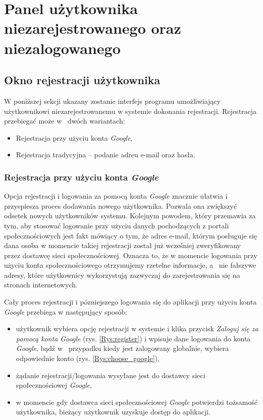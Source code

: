 \chapter{Panel użytkownika niezarejestrowanego oraz niezalogowanego}

\section{Okno rejestracji użytkownika}
W poniższej sekcji ukazany zostanie interfejs programu umożliwiający użytkownikowi niezarejestrowanemu w systemie dokonania rejestracji. Rejestracja przebiegać może w~ dwóch wariantach:
\begin{itemize}
	\item Rejestracja przy użyciu konta \textit{Google},
	\item Rejestracja tradycyjna -- podanie adreu e-mail oraz hasła.
\end{itemize}

\subsection{Rejestracja przy użyciu konta \textit{Google}}
Opcja rejestracji i logowania za pomocą konta \textit{Google} znacznie ułatwia i przyspiesza proces dodawania nowego użytkownika. Pozwala ona zwiększyć odsetek nowych użytkowników systemu. Kolejnym powodem, który przemawia za tym, aby stosować logowanie przy użyciu danych pochodzących z portali społecznościowych jest fakt mówiący o tym, że adres e-mail, którym posługuje się dana osoba w momencie takiej rejestracji został już wcześniej zweryfikowany przez dostawcę sieci społecznościowej. Oznacza to, że w momencie logowania przy użyciu konta społecznościowego otrzymujemy rzetelne informacje, a~ nie fałszywe adresy, które użytkownicy wykorzystują zazwyczaj do zarejestrowania się na stronach internetowych. 

Cały proces rejestracji i pózniejszego logowania się do aplikacji przy użyciu konta \textit{Google} przebiega w następujący sposób: 
\begin{itemize}
	\item użytkownik wybiera opcję rejestracji w systemie i klika przycisk \textit{Zaloguj się za pomocą konta} \textit{Google} (rys. \ref{Rys:register}) i wpisuje dane logowania do konta \textit{Google}, bądź w~ przypadku kiedy jest zalogowany globalnie, wybiera odpowiednie konto (rys. \ref{Rys:choose_google}),
	\item żądanie rejestracji/logowania wysyłane jest do dostawcy sieci społecznościowej \textit{Google},
	\item w momencie gdy dostawca sieci społecznościowej \textit{Google} potwierdzi tożsamość użytkownika, bieżący użytkownik uzyskuje dostęp do aplikacji.
\end{itemize}

